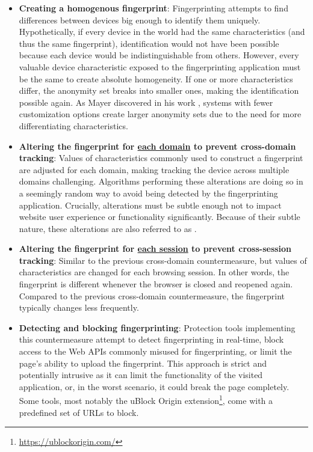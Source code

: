 \begin{itemize}
	\item \textbf{Creating a homogenous fingerprint}: Fingerprinting attempts to find differences between devices big enough to identify them uniquely. Hypothetically, if every device in the world had the same characteristics (and thus the same fingerprint), identification would not have been possible because each device would be indistinguishable from others. However, every valuable device characteristic exposed to the fingerprinting application must be the same to create absolute homogeneity. If one or more characteristics differ, the anonymity set breaks into smaller ones, making the identification possible again. As Mayer discovered in his work \cite{MayerAnyPerson}, systems with fewer customization options create larger anonymity sets due to the need for more differentiating characteristics.
	\item \textbf{Altering the fingerprint for \underline{each domain} to prevent cross-domain tracking}: Values of characteristics commonly used to construct a fingerprint are adjusted for each domain, making tracking the device across multiple domains challenging. Algorithms performing these alterations are doing so in a seemingly random way to avoid being detected by the fingerprinting application. Crucially, alterations must be subtle enough not to impact website user experience or functionality significantly. Because of their subtle nature, these alterations are also referred to as .
	\item \textbf{Altering the fingerprint for \underline{each session} to prevent cross-session tracking}: Similar to the previous cross-domain countermeasure, but values of characteristics are changed for each browsing session. In other words, the fingerprint is different whenever the browser is closed and reopened again. Compared to the previous cross-domain countermeasure, the fingerprint typically changes less frequently.
	\item \textbf{Detecting and blocking fingerprinting}: Protection tools implementing this countermeasure attempt to detect fingerprinting in real-time, block access to the Web APIs commonly misused for fingerprinting, or limit the page's ability to upload the fingerprint. This approach is strict and potentially intrusive as it can limit the functionality of the visited application, or, in the worst scenario, it could break the page completely. Some tools, most notably the uBlock Origin extension\footnote{\url{https://ublockorigin.com/}}, come with a predefined set of URLs to block.
\end{itemize}

